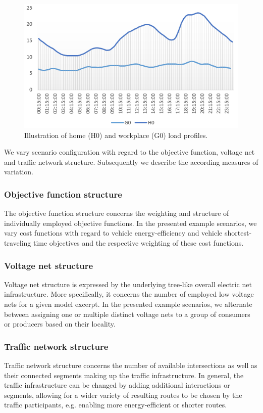 \begin{figure}
	\centering
	\includegraphics[width=\columnwidth]{gfx/profiles.PNG}
	\caption{Illustration of home (H0) and workplace (G0) load profiles.}
	\label{profiles}
\end{figure}

We vary scenario configuration with regard to the objective function, voltage net and traffic network structure. Subsequently we describe the according measures of variation.

\subsubsection{Objective function structure}

The objective function structure concerns the weighting and structure of individually employed objective functions. In the presented example scenarios, we vary cost functions with regard to vehicle energy-efficiency and vehicle shortest-traveling time objectives and the respective weighting of these cost functions. 

\subsubsection{Voltage net structure}
Voltage net structure is expressed by the underlying tree-like overall electric net infrastructure. More specifically, it concerns the number of employed low voltage nets for a given model excerpt. In the presented example scenarios, we alternate between assigning one or multiple distinct voltage nets to a group of consumers or producers based on their locality.

\subsubsection{Traffic network structure}
Traffic network structure concerns the number of available intersections as well as their connected segments making up the traffic infrastructure. In general, the traffic infrastructure can be changed by adding additional interactions or segments, allowing for a wider variety of resulting routes to be chosen by the traffic participants, e.g. enabling more energy-efficient or shorter routes.

